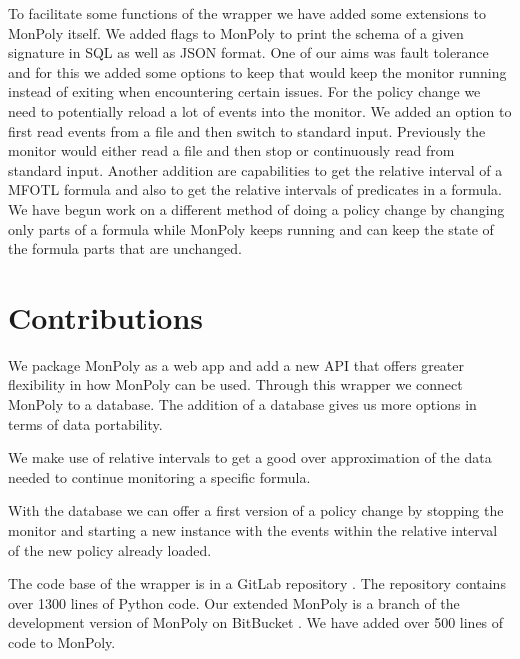 To facilitate some functions of the wrapper we have added some extensions to MonPoly itself.
We added flags to MonPoly to print the schema of a given signature in SQL as well as JSON format.
One of our aims was fault tolerance and for this we added some options to keep that would keep the monitor running instead of exiting when encountering certain issues.
For the policy change we need to potentially reload a lot of events into the monitor.
We added an option to first read events from a file and then switch to standard input.
Previously the monitor would either read a file and then stop or continuously read from standard input.
Another addition are capabilities to get the relative interval of a MFOTL formula and also to get the relative intervals of predicates in a formula.
We have begun work on a different method of doing a policy change by changing only parts of a formula while MonPoly keeps running and can keep the state of the formula parts that are unchanged.


\section{Contributions}
We package MonPoly as a web app and add a new API that offers greater flexibility in how MonPoly can be used.
Through this wrapper we connect MonPoly to a database.
The addition of a database gives us more options in terms of data portability.

We make use of relative intervals \cite{Basin2016} to get a good over approximation of the data needed to continue monitoring a specific formula.

With the database we can offer a first version of a policy change by stopping the monitor and starting a new instance with the events within the relative interval of the new policy already loaded.

The code base of the wrapper is in a GitLab repository \cite{git-wrapper}.
The repository contains over 1300 lines of Python code.
Our extended MonPoly is a branch of the development version of MonPoly on BitBucket \cite{git-monpoly-branch}.
We have added over 500 lines of code to MonPoly.

